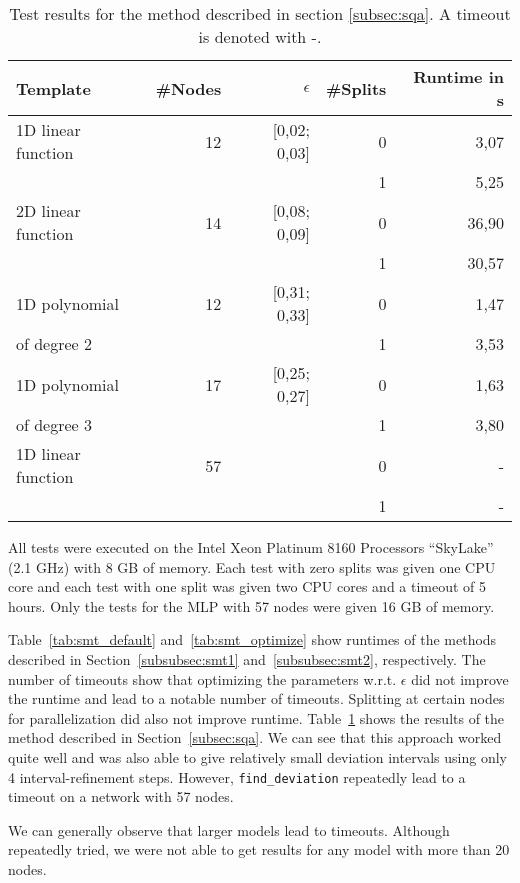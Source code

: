     \begin{table}
        \centering
            \begin{tabular}{|l|r|r|r|r|}
                 \hline
                 Template &  \#Nodes    & $\epsilon$ & \#Splits     & Runtime in \si{\s}\\
                 \hline
                 \hline
                 1D linear function        &    12             & [0,02; 0,03] & 0& 3,07\\
                                           &                   &           & 1& 5,25\\ \hline
                 2D linear function        &    14             & [0,08; 0,09] & 0& 36,90 \\
                                           &                   &           & 1& 30,57 \\ \hline
                 1D polynomial             &    12             & [0,31; 0,33] & 0& 1,47 \\
                 of degree 2               &                   &           & 1& 3,53\\ \hline
                 1D polynomial             &    17             & [0,25; 0,27] & 0& 1,63 \\
                 of degree 3               &                   &           & 1& 3,80\\ \hline
                 1D linear function        &    57             &             & 0& -\\
                                           &                   &           & 1& -\\ \hline
            \end{tabular}
        \caption{Test results for the method described in section \ref{subsec:sqa}. A timeout is denoted with -.}
        \label{tab:least_squares}
    \end{table}
    All tests were executed on the Intel Xeon Platinum 8160 Processors “SkyLake” (2.1 GHz) with 8 GB of memory. Each test with zero splits was given one CPU core and each test with one split was given two CPU cores and a timeout of 5 hours. Only the tests for the MLP with 57 nodes were given 16 GB of memory.\par
    Table~\ref{tab:smt_default} and~\ref{tab:smt_optimize} show runtimes of the methods described in Section~\ref{subsubsec:smt1} and~\ref{subsubsec:smt2}, respectively. The number of timeouts show that optimizing the parameters w.r.t. $\epsilon$ did not improve the runtime and lead to a notable number of timeouts. Splitting at certain nodes for parallelization did also not improve runtime.
    Table~\ref{tab:least_squares} shows the results of the method described in Section~\ref{subsec:sqa}. We can see that this approach worked quite well and was also able to give relatively small deviation intervals using only 4 interval-refinement steps. However, \lstinline{find_deviation} repeatedly lead to a timeout on a network with 57 nodes.\par
    We can generally observe that larger models lead to timeouts. Although repeatedly tried, we were not able to get results for any model with more than 20 nodes.